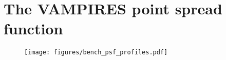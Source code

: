 \section{The VAMPIRES point spread function}\label{sec:psf}


\begin{figure}
    \centering
    \texttt{[image: figures/bench\_psf\_profiles.pdf]}
    \caption{\label{fig:bench_profile}}
\end{figure}
